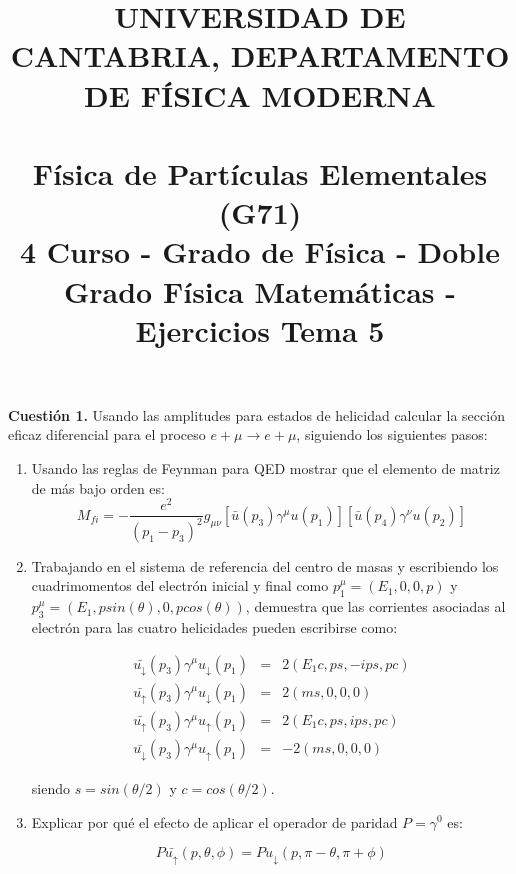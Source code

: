 \documentclass[paper=a4, fontsize=11pt]{scrartcl} %
\date{}
\title{	
\normalfont \normalsize 
\textsc{UNIVERSIDAD DE CANTABRIA, DEPARTAMENTO DE FÍSICA MODERNA} \\ [20pt] %
\horrule{0.5pt} \\[0.4cm] %
\huge Física de Partículas Elementales (G71) \\ %
\normalsize 4 Curso - Grado de Física - Doble Grado Física Matemáticas - Ejercicios Tema 5
\horrule{2pt} \\[0.5cm] %
}
\numberwithin{equation}{section} %
\numberwithin{figure}{section} %
\numberwithin{table}{section} %
\begin{document}
\maketitle %

\vspace{-2.5cm}

\textbf{Cuestión 1.} Usando las amplitudes para estados de helicidad calcular la sección eficaz diferencial para el proceso $e+\mu\rightarrow e+\mu$, siguiendo
los siguientes pasos:

\begin{enumerate}
\item Usando las reglas de Feynman para QED mostrar que el elemento de matriz de más bajo orden es:
\begin{equation*}
M_{fi} = -\frac{e^2}{(p_1-p_3)^2}g_{\mu\nu}[\bar{u}(p_3)\gamma^\mu u(p_1)][\bar{u}(p_4)\gamma^\nu u(p_2)]
\end{equation*}

\item Trabajando en el sistema de referencia del centro de masas y escribiendo los cuadrimomentos del electrón inicial y final como $p_1^\mu = (E_1, 0, 0, p)$ y $p_3^\mu = (E_1, p sin(\theta), 0, p cos(\theta))$, demuestra que las corrientes asociadas al electrón para las cuatro helicidades pueden escribirse como:

\begin{eqnarray*}
\bar{u_{\downarrow}}(p_3)\gamma^\mu u_{\downarrow}(p_1) &=& 2 (E_1 c, ps, -ips, pc) \\
\bar{u_{\uparrow}}(p_3)\gamma^\mu u_{\downarrow}(p_1) &=& 2 (ms, 0, 0, 0) \\
\bar{u_{\uparrow}}(p_3)\gamma^\mu u_{\uparrow}(p_1) &=& 2 (E_1 c, ps, ips, pc) \\
\bar{u_{\downarrow}}(p_3)\gamma^\mu u_{\uparrow}(p_1) &=& -2 (ms, 0, 0, 0)
\end{eqnarray*}

siendo $s = sin(\theta / 2)$ y $c = cos(\theta/2)$.

\item Explicar por qué el efecto de aplicar el operador de paridad $P=\gamma^0$ es:

\begin{equation*}
P\bar{u_{\uparrow}}(p, \theta, \phi) = Pu_{\downarrow}(p, \pi - \theta, \pi + \phi) 
\end{equation*}


\end{enumerate}
\end{document}
